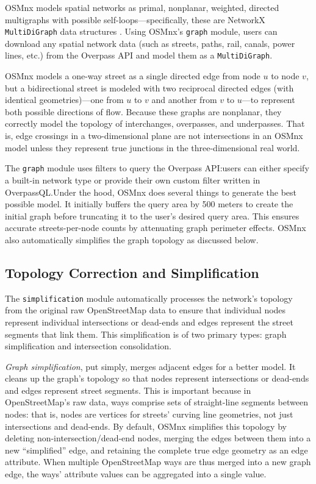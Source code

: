 \documentclass[12pt,letterpaper]{article} %
\begin{document}
OSMnx models spatial networks as primal, nonplanar, weighted, directed multigraphs with possible self-loops---specifically, these are NetworkX \texttt{MultiDiGraph} data structures \citep{hagberg_exploring_2008}. Using OSMnx's \texttt{graph} module, users can download any spatial network data (such as streets, paths, rail, canals, power lines, etc.) from the Overpass API and model them as a \texttt{MultiDiGraph}.

OSMnx models a one-way street as a single directed edge from node $u$ to node $v$, but a bidirectional street is modeled with two reciprocal directed edges (with identical geometries)---one from $u$ to $v$ and another from $v$ to $u$---to represent both possible directions of flow. Because these graphs are nonplanar, they correctly model the topology of interchanges, overpasses, and underpasses. That is, edge crossings in a two-dimensional plane are not intersections in an OSMnx model unless they represent true junctions in the three-dimensional real world.

The \texttt{graph} module uses filters to query the Overpass API:\@ users can either specify a built-in network type or provide their own custom filter written in OverpassQL.\@ Under the hood, OSMnx does several things to generate the best possible model. It initially buffers the query area by 500 meters to create the initial graph before truncating it to the user's desired query area. This ensures accurate streets-per-node counts by attenuating graph perimeter effects. OSMnx also automatically simplifies the graph topology as discussed below.

\subsection{Topology Correction and Simplification}

The \texttt{simplification} module automatically processes the network's topology from the original raw OpenStreetMap data to ensure that individual nodes represent individual intersections or dead-ends and edges represent the street segments that link them. This simplification is of two primary types: graph simplification and intersection consolidation.

\textit{Graph simplification}, put simply, merges adjacent edges for a better model. It cleans up the graph's topology so that nodes represent intersections or dead-ends and edges represent street segments. This is important because in OpenStreetMap's raw data, ways comprise sets of straight-line segments between nodes: that is, nodes are vertices for streets' curving line geometries, not just intersections and dead-ends. By default, OSMnx simplifies this topology by deleting non-intersection/dead-end nodes, merging the edges between them into a new \enquote{simplified} edge, and retaining the complete true edge geometry as an edge attribute. When multiple OpenStreetMap ways are thus merged into a new graph edge, the ways' attribute values can be aggregated into a single value.
\end{document}
